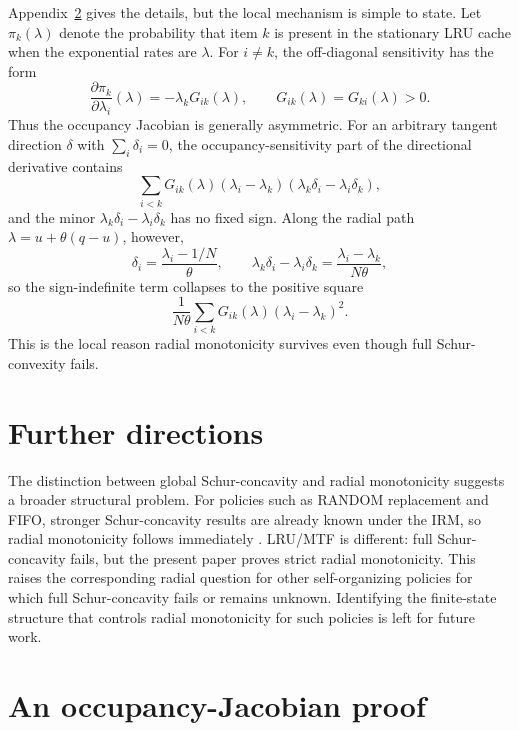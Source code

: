 \documentclass[11pt]{article}
\theoremstyle{remark}
\begin{document}
Appendix~\ref{app:jacobian-proof} gives the details, but the local
mechanism is simple to state.  Let $\pi_k(\lambda)$ denote the probability
that item $k$ is present in the stationary LRU cache when the exponential
rates are $\lambda$.  For $i\ne k$, the off-diagonal sensitivity has the
form
\[
        \frac{\partial \pi_k}{\partial \lambda_i}(\lambda)
        =-\lambda_k G_{ik}(\lambda),
        \qquad G_{ik}(\lambda)=G_{ki}(\lambda)>0.
\]
Thus the occupancy Jacobian is generally asymmetric.  For an arbitrary
tangent direction $\delta$ with $\sum_i\delta_i=0$, the occupancy-sensitivity
part of the directional derivative contains
\[
        \sum_{i<k}G_{ik}(\lambda)
        (\lambda_i-\lambda_k)(\lambda_k\delta_i-\lambda_i\delta_k),
\]
and the minor $\lambda_k\delta_i-\lambda_i\delta_k$ has no fixed sign.
Along the radial path $\lambda=u+\theta(q-u)$, however,
\[
        \delta_i=\frac{\lambda_i-1/N}{\theta},
        \qquad
        \lambda_k\delta_i-\lambda_i\delta_k
        =\frac{\lambda_i-\lambda_k}{N\theta},
\]
so the sign-indefinite term collapses to the positive square
\[
        \frac{1}{N\theta}
        \sum_{i<k}G_{ik}(\lambda)(\lambda_i-\lambda_k)^2.
\]
This is the local reason radial monotonicity survives even though full
Schur-convexity fails.

\section{Further directions}\label{sec:further-directions}

The distinction between global Schur-concavity and radial monotonicity
suggests a broader structural problem.  For policies such as RANDOM
replacement and FIFO, stronger Schur-concavity results are already known
under the IRM, so radial monotonicity follows immediately
\cite{VanichpunMakowski2004,MakowskiVanichpun2005}.  LRU/MTF is different:
full Schur-concavity fails, but the present paper proves strict radial
monotonicity.  This raises the corresponding radial question for other
self-organizing policies for which full Schur-concavity fails or remains
unknown.  Identifying the finite-state structure that controls radial
monotonicity for such policies is left for future work.

\appendix

\section{An occupancy-Jacobian proof}\label{app:jacobian-proof}
\end{document}
